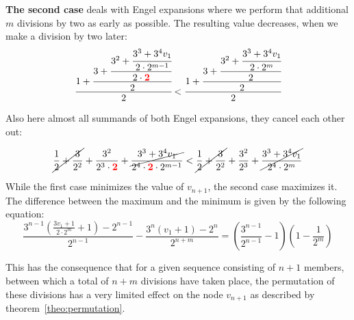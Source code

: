 \documentclass[12pt]{amsart}
\theoremstyle{definition}
\begin{document}
\par\bigskip\noindent
\textbf{The second case} deals with Engel expansions where we perform that additional $m$ divisions by two as early as possible. The resulting value decreases, when we make a division by two later:
\[
\cfrac{1+\cfrac{3+\cfrac{3^2+\cfrac{3^3+3^4v_1}{2\cdot2^{m-1}}}{2\cdot\textcolor{red}{\mathbf{2}}}}{2}}{2}
<
\cfrac{1+\cfrac{3+\cfrac{3^2+\cfrac{3^3+3^4v_1}{2\cdot2^m}}{2}}{2}}{2}
\]

\par\bigskip
Also here almost all summands of both Engel expansions, they cancel each other out:

\[
\cancel{\frac{1}{2}+\frac{3}{2^2}}+\frac{3^2}{2^3\cdot\textcolor{red}{\mathbf{2}}}+\cancel{\frac{3^3+3^4v_1}{2^4\cdot\textcolor{red}{\mathbf{2}}\cdot2^{m-1}}}
<
\cancel{\frac{1}{2}+\frac{3}{2^2}}+\frac{3^2}{2^3}+\cancel{\frac{3^3+3^4v_1}{2^4\cdot2^m}}
\]

\par\medskip
While the first case minimizes the value of $v_{n+1}$, the second case maximizes it. The difference between the maximum and the minimum is given by the following equation:
\[
\frac{3^{n-1}\left(\frac{3v_1+1}{2\cdot2^m}+1\right)-2^{n-1}}{2^{n-1}}-\frac{3^n\left(v_1+1\right)-2^n}{2^{n+m}}=\left(\frac{3^{n-1}}{2^{n-1}}-1\right)\left(1-\frac{1}{2^m}\right)
\]

\par\medskip
This has the consequence that for a given sequence consisting of $n+1$ members, between which a total of $n+m$ divisions have taken place, the permutation of these divisions has a very limited effect on the node $v_{n+1}$ as described by theorem~\ref{theo:permutation}.
\end{document}
